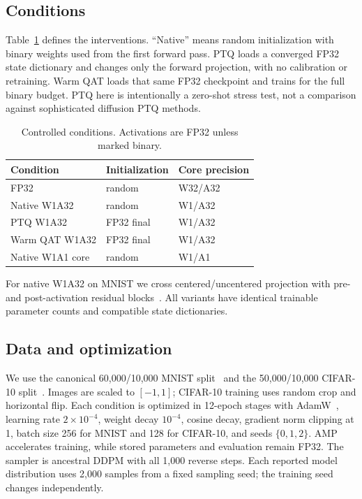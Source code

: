 \documentclass[conference]{IEEEtran}
\begin{document}
\subsection{Conditions}

Table~\ref{tab:conditions} defines the interventions. ``Native'' means random
initialization with binary weights used from the first forward pass. PTQ loads a
converged FP32 state dictionary and changes only the forward projection, with no
calibration or retraining. Warm QAT loads that same FP32 checkpoint and trains for
the full binary budget. PTQ here is intentionally a zero-shot stress test, not a
comparison against sophisticated diffusion PTQ methods.

\begin{table}[t]
\centering
\caption{Controlled conditions. Activations are FP32 unless marked binary.}
\label{tab:conditions}
\small
\begin{tabular}{lll}
\toprule
Condition & Initialization & Core precision \\
\midrule
FP32 & random & W32/A32 \\
Native W1A32 & random & W1/A32 \\
PTQ W1A32 & FP32 final & W1/A32 \\
Warm QAT W1A32 & FP32 final & W1/A32 \\
Native W1A1 core & random & W1/A1 \\
\bottomrule
\end{tabular}
\end{table}

For native W1A32 on MNIST we cross centered/uncentered projection with pre- and
post-activation residual blocks~\cite{he2016preact}. All variants have identical
trainable parameter counts and compatible state dictionaries.

\subsection{Data and optimization}

We use the canonical 60,000/10,000 MNIST split~\cite{lecun1998mnist} and the
50,000/10,000 CIFAR-10 split~\cite{krizhevsky2009cifar}. Images are scaled to
$[-1,1]$; CIFAR-10 training uses random crop and horizontal flip. Each condition
is optimized in 12-epoch stages with AdamW~\cite{loshchilov2019adamw}, learning
rate $2\times10^{-4}$, weight decay $10^{-4}$, cosine decay, gradient norm
clipping at 1, batch size 256 for MNIST and 128 for CIFAR-10, and seeds
$\{0,1,2\}$. AMP accelerates training, while stored parameters and evaluation
remain FP32. The sampler is ancestral DDPM with all 1,000 reverse steps. Each
reported model distribution uses 2,000 samples from a fixed sampling seed; the
training seed changes independently.
\end{document}
